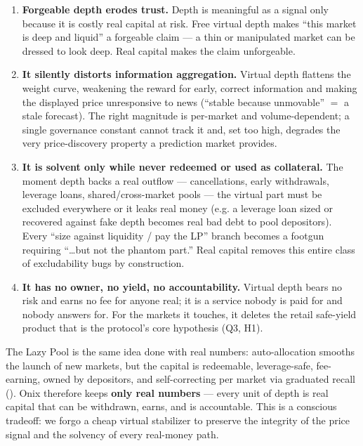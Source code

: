 \documentclass{ledger}
\theoremstyle{plain}
\theoremstyle{remark}
\begin{document}
\begin{enumerate}
  \item \textbf{Forgeable depth erodes trust.} Depth is meaningful as a signal
  only because it is costly real capital at risk. Free virtual depth makes
  ``this market is deep and liquid'' a forgeable claim --- a thin or manipulated
  market can be dressed to look deep. Real capital makes the claim unforgeable.
  \item \textbf{It silently distorts information aggregation.} Virtual depth
  flattens the weight curve, weakening the reward for early, correct information
  and making the displayed price unresponsive to news (``stable because
  unmovable'' $=$ a stale forecast). The right magnitude is per-market and
  volume-dependent; a single governance constant cannot track it and, set too
  high, degrades the very price-discovery property a prediction market provides.
  \item \textbf{It is solvent only while never redeemed or used as collateral.}
  The moment depth backs a real outflow --- cancellations, early withdrawals,
  leverage loans, shared/cross-market pools --- the virtual part must be excluded
  everywhere or it leaks real money (e.g. a leverage loan sized or recovered
  against fake depth becomes real bad debt to pool depositors). Every ``size
  against liquidity / pay the LP'' branch becomes a footgun requiring ``\ldots but
  not the phantom part.'' Real capital removes this entire class of
  excludability bugs by construction.
  \item \textbf{It has no owner, no yield, no accountability.} Virtual depth
  bears no risk and earns no fee for anyone real; it is a service nobody is paid
  for and nobody answers for. For the markets it touches, it deletes the retail
  safe-yield product that is the protocol's core hypothesis (Q3, H1).
\end{enumerate}

The Lazy Pool is the same idea done with real numbers: auto-allocation smooths
the launch of new markets, but the capital is redeemable, leverage-safe,
fee-earning, owned by depositors, and self-correcting per market via graduated
recall (). Onix therefore keeps \textbf{only real numbers} ---
every unit of depth is real capital that can be withdrawn, earns, and is
accountable. This is a conscious tradeoff: we forgo a cheap virtual stabilizer
to preserve the integrity of the price signal and the solvency of every
real-money path.

\end{document}
